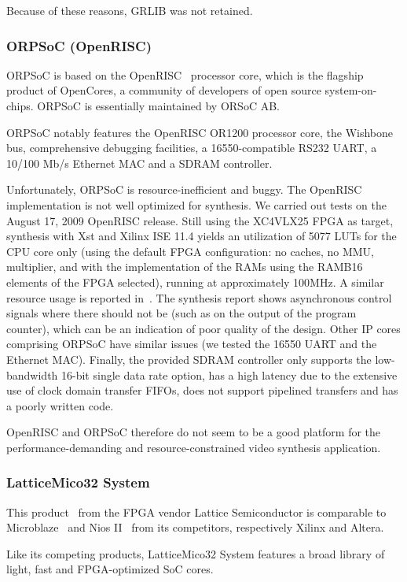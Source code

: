 \documentclass[a4paper,11pt]{kthesis}
\begin{document}
Because of these reasons, GRLIB was not retained.

\subsubsection{ORPSoC (OpenRISC)}
ORPSoC is based on the OpenRISC~\cite{openrisc} processor core, which is the flagship product of OpenCores, a community of developers of open source system-on-chips. ORPSoC is essentially maintained by ORSoC AB.

ORPSoC notably features the OpenRISC OR1200 processor core, the Wishbone~\cite{wishbone} bus, comprehensive debugging facilities, a 16550-compatible RS232 UART, a 10/100 Mb/s Ethernet MAC and a SDRAM controller.

Unfortunately, ORPSoC is resource-inefficient and buggy. The OpenRISC implementation is not well optimized for synthesis. We carried out tests on the August 17, 2009 OpenRISC release. Still using the XC4VLX25 FPGA as target, synthesis with Xst and Xilinx ISE 11.4 yields an utilization of 5077 LUTs for the CPU core only (using the default FPGA configuration: no caches, no MMU, multiplier, and with the implementation of the RAMs using the RAMB16 elements of the FPGA selected), running at approximately 100MHz. A similar resource usage is reported in~\cite{softcorecomp}. The synthesis report shows asynchronous control signals where there should not be (such as on the output of the program counter), which can be an indication of poor quality of the design. Other IP cores comprising ORPSoC have similar issues (we tested the 16550 UART and the Ethernet MAC). Finally, the provided SDRAM controller only supports the low-bandwidth 16-bit single data rate option, has a high latency due to the extensive use of clock domain transfer FIFOs, does not support pipelined transfers and has a poorly written code.

OpenRISC and ORPSoC therefore do not seem to be a good platform for the performance-demanding and resource-constrained video synthesis application.

\subsubsection{LatticeMico32 System}
This product~\cite{mico32} from the FPGA vendor Lattice Semiconductor is comparable to Microblaze~\cite{microblaze} and Nios II~\cite{nios} from its competitors, respectively Xilinx and Altera.

Like its competing products, LatticeMico32 System features a broad library of light, fast and FPGA-optimized SoC cores.
\end{document}
